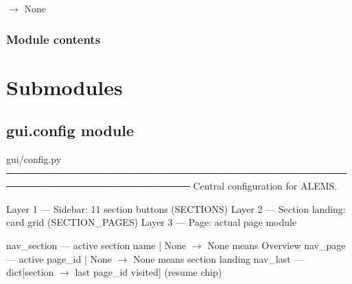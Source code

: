 \documentclass[letterpaper,10pt,english]{sphinxmanual}
\begin{document}
\begin{fulllineitems}
\label{\detokenize{gui.pages.water_methane:gui.pages.water_methane.render}}
\pysigstartsignatures
\pysiglinewithargsret
{}
{}
{{ $\rightarrow$ None}}
\pysigstopsignatures
\end{fulllineitems}



\subsubsection{Module contents}
\label{\detokenize{gui.pages:module-gui.pages}}\label{\detokenize{gui.pages:module-contents}}

\section{Submodules}
\label{\detokenize{gui:submodules}}
\sphinxstepscope


\subsection{gui.config module}
\label{\detokenize{gui.config:module-gui.config}}\label{\detokenize{gui.config:gui-config-module}}\label{\detokenize{gui.config::doc}}
\sphinxAtStartPar
gui/config.py
─────────────────────────────────────────────────────────────────────────────
Central configuration for A\sphinxhyphen{}LEMS.
\begin{description}
\sphinxAtStartPar
Layer 1 — Sidebar:         11 section buttons  (SECTIONS)
Layer 2 — Section landing: card grid            (SECTION\_PAGES)
Layer 3 — Page:            actual page module

\sphinxAtStartPar
nav\_section  — active section name | None  \(\rightarrow\) None means Overview
nav\_page     — active page\_id      | None  \(\rightarrow\) None means section landing
nav\_last     — dict{[}section \(\rightarrow\) last page\_id visited{]}  (resume chip)

\end{description}
\end{document}
